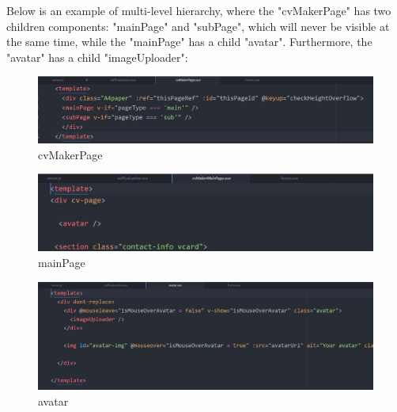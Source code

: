 \documentclass[11pt]{article}
\begin{document}
\begin{spacing}{1.0}
\begin{itemize}
	Below is an example of multi-level hierarchy, where the "cvMakerPage" has two children components: "mainPage" and "subPage", which will never be visible at the same time, while the "mainPage" has a child "avatar". Furthermore, the "avatar" has a child "imageUploader":
	\begin{figure}[H]
	\centering
	\includegraphics[scale=.3]{figures/html/2_cvMakerPage.jpg}
	\caption{cvMakerPage}
	\end{figure}
	
	\begin{figure}[H]
	\centering
	\includegraphics[scale=.4]{figures/html/2_cvMakerMainPage.jpg}
	\caption{mainPage}
	\end{figure}
	
	\begin{figure}[H]
	\centering
	\includegraphics[scale=.3]{figures/html/2_avatar.jpg}
	\caption{avatar}
	\end{figure}



\end{itemize}
\end{spacing}
\end{document}
